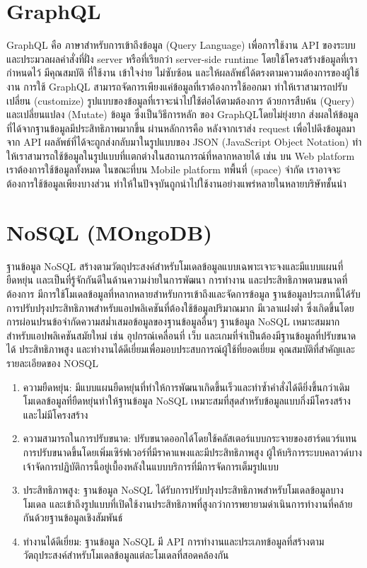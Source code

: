 \section{GraphQL}

GraphQL คือ ภาษาสำหรับการเข้าถึงข้อมูล (Query Language) เพื่อการใช้งาน API ของระบบและประมวลผลคำสั่งที่ฝั่ง server หรือที่เรียกว่า server-side runtime โดยใช้โครงสร้างข้อมูลที่เรากำหนดไว้ มีคุณสมบัติ ที่ใช้งาน เข้าใจง่าย ไม่ซับซ้อน และให้ผลลัพธ์ได้ตรงตามความต้องการของผู้ใช้งาน การใช้ GraphQL สามารถจัดการเพียงแค่ข้อมูลที่เราต้องการใช้ออกมา ทำให้เราสามารถปรับเปลี่ยน (customize) รูปแบบของข้อมูลที่เราจะนำไปใช้ต่อได้ตามต้องการ ด้วยการสืบค้น (Query) และเปลี่ยนแปลง (Mutate) ข้อมูล ซึ่งเป็นวิธีการหลัก ของ GraphQLโดยไม่ยุ่งยาก ส่งผลให้ข้อมูลที่ได้จากฐานข้อมูลมีประสิทธิภาพมากขึ้น ผ่านหลักการคือ หลังจากเราส่ง request เพื่อไปดึงข้อมูลมาจาก API ผลลัพธ์ที่ได้จะถูกส่งกลับมาในรูปแบบของ JSON (JavaScript Object Notation) ทําให้เราสามารถใช้ข้อมูลในรูปแบบที่เเตกต่างในสถานการณ์ที่หลากหลายได้ เช่น บน Web platform เราต้องการใช้ข้อมูลทั้งหมด ในขณะที่บน Mobile platform ทพื้นที่ (space) จำกัด เราอาจจะต้องการใช้ข้อมูลเพียงบางส่วน ทําให้ในปัจจุบันถูกนำไปใช้งานอย่างแพร่หลายในหลายบริษัทชั้นนํา

\section{NoSQL (MOngoDB)}

ฐานข้อมูล NoSQL สร้างตามวัตถุประสงค์สำหรับโมเดลข้อมูลแบบเฉพาะเจาะจงและมีแบบแผนที่ยืดหยุ่น เเละเป็นที่รู้จักกันดีในด้านความง่ายในการพัฒนา การทำงาน และประสิทธิภาพตามขนาดที่ต้องการ มีการใช้โมเดลข้อมูลที่หลากหลายสำหรับการเข้าถึงและจัดการข้อมูล ฐานข้อมูลประเภทนี้ได้รับการปรับปรุงประสิทธิภาพสำหรับแอปพลิเคชันที่ต้องใช้ข้อมูลปริมาณมาก มีเวลาแฝงต่ำ ซึ่งเกิดขึ้นโดยการผ่อนปรนข้อจำกัดความสม่ำเสมอข้อมูลของฐานข้อมูลอื่นๆ ฐานข้อมูล NoSQL เหมาะสมมากสำหรับแอปพลิเคชันสมัยใหม่ เช่น อุปกรณ์เคลื่อนที่ เว็บ และเกมที่จำเป็นต้องมีฐานข้อมูลที่ปรับขนาดได้ ประสิทธิภาพสูง และทำงานได้ดีเยี่ยมเพื่อมอบประสบการณ์ผู้ใช้ที่ยอดเยี่ยม 
คุณสมบัติที่สําคัญเเละรายละเอียดของ NOSQL

\begin{enumerate}
  \item ความยืดหยุ่น: มีแบบแผนยืดหยุ่นที่ทำให้การพัฒนาเกิดขึ้นเร็วและทำซ้ำคำสั่งได้ดียิ่งขึ้นกว่าเดิม โมเดลข้อมูลที่ยืดหยุ่นทำให้ฐานข้อมูล NoSQL เหมาะสมที่สุดสำหรับข้อมูลแบบกึ่งมีโครงสร้างและไม่มีโครงสร้าง

  \item ความสามารถในการปรับขนาด: ปรับขนาดออกได้โดยใช้คลัสเตอร์แบบกระจายของฮาร์ดแวร์แทนการปรับขนาดขึ้นโดยเพิ่มเซิร์ฟเวอร์ที่มีราคาแพงและมีประสิทธิภาพสูง ผู้ให้บริการระบบคลาวด์บางเจ้าจัดการปฏิบัติการนี้อยู่เบื้องหลังในแบบบริการที่มีการจัดการเต็มรูปแบบ

  \item ประสิทธิภาพสูง: ฐานข้อมูล NoSQL ได้รับการปรับปรุงประสิทธิภาพสำหรับโมเดลข้อมูลบางโมเดล และเข้าถึงรูปแบบที่เปิดใช้งานประสิทธิภาพที่สูงกว่าการพยายามดำเนินการทำงานที่คล้ายกันด้วยฐานข้อมูลเชิงสัมพันธ์

  \item  ทำงานได้ดีเยี่ยม: ฐานข้อมูล NoSQL มี API การทำงานและประเภทข้อมูลที่สร้างตามวัตถุประสงค์สำหรับโมเดลข้อมูลแต่ละโมเดลที่สอดคล้องกัน
\end{enumerate}


